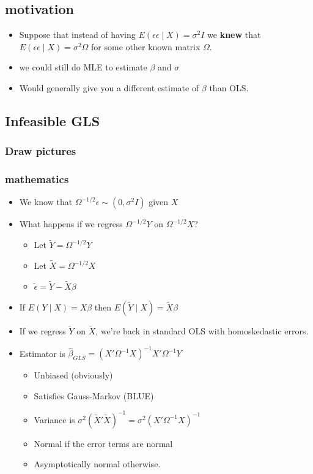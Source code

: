 \documentclass[11pt]{article}
\begin{document}
\subsection{motivation}
\label{sec-3-1}

\begin{itemize}
\item Suppose that instead of having $E( \epsilon \epsilon \mid X) =
       \sigma^2 I$ we \textbf{knew} that $E(\epsilon \epsilon \mid X) =
       \sigma^2 \Omega$ for some other known matrix $\Omega$.
\item we could still do MLE to estimate $\beta$ and $\sigma$
\item Would generally give you a different estimate of $\beta$ than
       OLS.
\end{itemize}
\subsection{Infeasible GLS}
\label{sec-3-2}
\subsubsection{Draw pictures}
\label{sec-3-2-1}
\subsubsection{mathematics}
\label{sec-3-2-2}

\begin{itemize}
\item We know that $\Omega^{-1/2}\epsilon \sim (0, \sigma^2 I)$ given $X$
\item What happens if we regress $\Omega^{-1/2} Y$ on $\Omega^{-1/2} X$?
\begin{itemize}
\item Let $\tilde Y = \Omega^{-1/2} Y$
\item Let $\tilde X = \Omega^{-1/2} X$
\item $\tilde\epsilon = \tilde Y - \tilde X \beta$
\end{itemize}
\item If $E(Y \mid X) = X\beta$ then $E(\tilde Y \mid X) = \tilde X
        \beta$
\item If we regress $\tilde Y$ on $\tilde X$, we're back in standard
        OLS with homoskedastic errors.
\item Estimator is $\hat\beta_{GLS} =
        (X'\Omega^{-1}X)^{-1}X'\Omega^{-1}Y$
\begin{itemize}
\item Unbiased (obviously)
\item Satisfies Gauss-Markov (BLUE)
\item Variance is $\sigma^2 (\tilde X' \tilde X)^{-1} = \sigma^2
          (X' \Omega^{-1} X)^{-1}$
\item Normal if the error terms are normal
\item Asymptotically normal otherwise.
\end{itemize}
\end{itemize}
\end{document}
